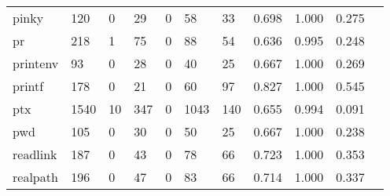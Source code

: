 \begin{longtable}{lp{1.10cm}p{1.10cm}p{1.10cm}p{1.10cm}p{1.10cm}p{1.10cm}p{1.10cm}p{1.10cm}p{1.10cm}p{1.10cm}}
pinky     &                    120 &                                  0 &                                29 &                                0 &                                58 &                              33 &                          0.698 &                                 1.000 &                               0.275 \\
pr        &                    218 &                                  1 &                                75 &                                0 &                                88 &                              54 &                          0.636 &                                 0.995 &                               0.248 \\
printenv  &                     93 &                                  0 &                                28 &                                0 &                                40 &                              25 &                          0.667 &                                 1.000 &                               0.269 \\
printf    &                    178 &                                  0 &                                21 &                                0 &                                60 &                              97 &                          0.827 &                                 1.000 &                               0.545 \\
ptx       &                   1540 &                                 10 &                               347 &                                0 &                              1043 &                             140 &                          0.655 &                                 0.994 &                               0.091 \\
pwd       &                    105 &                                  0 &                                30 &                                0 &                                50 &                              25 &                          0.667 &                                 1.000 &                               0.238 \\
readlink  &                    187 &                                  0 &                                43 &                                0 &                                78 &                              66 &                          0.723 &                                 1.000 &                               0.353 \\
realpath  &                    196 &                                  0 &                                47 &                                0 &                                83 &                              66 &                          0.714 &                                 1.000 &                               0.337 \\

\end{longtable}
